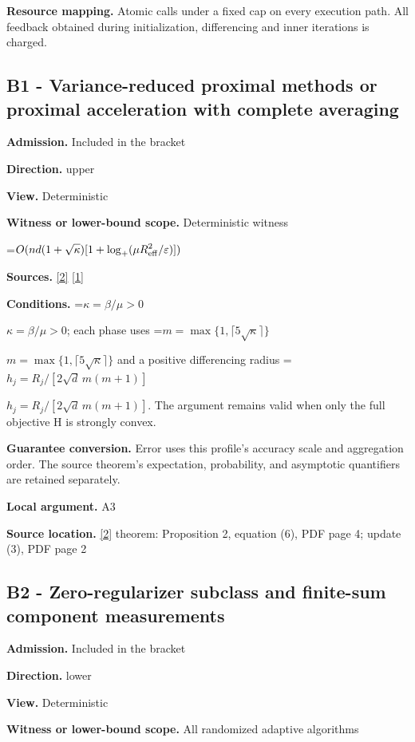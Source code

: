\documentclass[10pt,a4paper]{article}
\newcommand{\AtlasMath}[1]{\par\begingroup\centering\setbox0=\hbox{$\displaystyle #1$}\ifdim\wd0>1.4\linewidth\typeout{ATLAS WIDE FORMULA: \the\wd0}\fi\ifdim\wd0>\linewidth\resizebox{\linewidth}{!}{\box0}\else\box0\fi\par\endgroup}
\newcommand{\AtlasInlineMath}[1]{\begingroup\setbox0=\hbox{$#1$}\ifdim\wd0>.4\linewidth\endgroup\AtlasMath{#1}\else\endgroup$#1$\fi}
\begin{document}
\textbf{Resource mapping.} Atomic calls under a fixed cap on every execution path. All feedback obtained during initialization, differencing and inner iterations is charged.

\subsection{B1 - Variance-reduced proximal methods or proximal acceleration with complete averaging}
\textbf{Admission.} Included in the bracket

\textbf{Direction.} upper

\textbf{View.} Deterministic

\textbf{Witness or lower-bound scope.} Deterministic witness

\AtlasMath{O(nd(1+\sqrt\kappa)[1+\log_+(\mu R_{\rm eff}^2/\varepsilon)])}
\textbf{Sources.} \href{https://papers.neurips.cc/paper_files/paper/2011/file/8f7d807e1f53eff5f9efbe5cb81090fb-Paper.pdf}{[2]} \href{https://arxiv.org/html/2610.00345v1}{[1]}

\textbf{Conditions.} \AtlasInlineMath{\kappa=\beta/\mu>0}; each phase uses \AtlasInlineMath{m=\max\{1,\lceil5\sqrt\kappa\rceil\}} and a positive differencing radius \AtlasInlineMath{h_j=R_j/[2\sqrt d\,m(m+1)]}. The argument remains valid when only the full objective H is strongly convex.

\textbf{Guarantee conversion.} Error uses this profile's accuracy scale and aggregation order. The source theorem's expectation, probability, and asymptotic quantifiers are retained separately.

\textbf{Local argument.} A3

\textbf{Source location.} \href{https://papers.neurips.cc/paper_files/paper/2011/file/8f7d807e1f53eff5f9efbe5cb81090fb-Paper.pdf}{[2]} theorem: Proposition 2, equation (6), PDF page 4; update (3), PDF page 2

\subsection{B2 - Zero-regularizer subclass and finite-sum component measurements}
\textbf{Admission.} Included in the bracket

\textbf{Direction.} lower

\textbf{View.} Deterministic

\textbf{Witness or lower-bound scope.} All randomized adaptive algorithms
\end{document}
